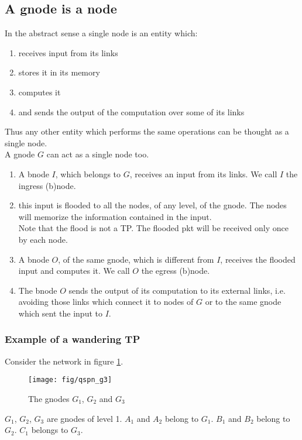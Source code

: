 \documentclass[a4paper]{article}
\begin{document}
\subsection{A gnode is a node}
In the abstract sense a single node is an entity which:
\begin{enumerate}
	\item receives input from its links
	\item stores it in its memory
	\item computes it
	\item and sends the output of the computation over some of its links
\end{enumerate}
Thus any other entity which performs the same operations can be thought as a
single node.\\
A gnode $G$ can act as a single node too.
\begin{enumerate}
	\item A bnode $I$, which belongs to $G$, receives an input from its
		links. We call $I$ the ingress (b)node.
	\item this input is flooded to all the nodes, of any level, of the
		gnode. The nodes will memorize the information contained in
		the input.\\
		Note that the flood is not a TP. The flooded pkt will be
		received only once by each node.
	\item A bnode $O$, of the same gnode, which is different from $I$,
		receives the flooded input and computes it.
		We call $O$ the egress (b)node.
	\item The bnode $O$ sends the output of its computation to its
		external links, i.e. avoiding those links which connect it to
		nodes of $G$ or to the same gnode which sent the input to $I$.
\end{enumerate}

\subsubsection{Example of a wandering TP}
Consider the network in figure \ref{fig:qspn_g3}.\\
\begin{figure}[h]
	\begin{center}
		\texttt{[image: fig/qspn\_g3]}
	\end{center}
	\caption{The gnodes $G_1$, $G_2$ and $G_3$}
	\label{fig:qspn_g3}
\end{figure}
$G_1$, $G_2$, $G_3$ are gnodes of level 1. $A_1$ and $A_2$ belong to $G_1$. $B_1$ and $B_2$ belong to
$G_2$. $C_1$ belongs to $G_3$.\\
\end{document}
